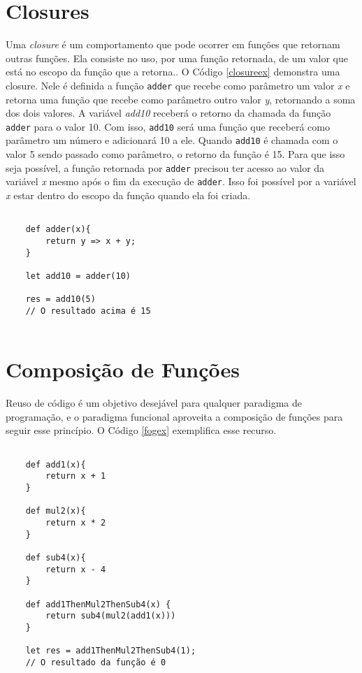 \section{Closures}

Uma \textit{closure} é um comportamento que pode 
ocorrer em funções que retornam outras funções. Ela 
consiste no uso, por uma função retornada, de um valor 
que está no escopo da função que a retorna.\cite{mflambdas}.
O Código \ref{closureex} 
demonstra uma closure. Nele é definida a função \texttt{adder} que 
recebe como parâmetro um valor \textit{x} e retorna uma função 
que recebe como parâmetro outro valor \textit{y}, retornando a 
soma dos dois valores. A variável \textit{add10} receberá 
o retorno da chamada da função \texttt{adder} para o valor 10. 
Com isso, \texttt{add10} será uma função que receberá como 
parâmetro um número e adicionará 10 a ele. Quando 
\texttt{add10} é chamada com o valor 5 sendo passado como 
parâmetro, o retorno da função é 15.
Para que isso seja possível, a função retornada por 
\texttt{adder} precisou ter acesso ao valor da variável 
\textit{x} mesmo 
após o fim da execução de \texttt{adder}. Isso foi possível 
por a variável \textit{x} estar dentro do escopo da função 
quando ela foi criada.

\begin{lstlisting}[caption={Exemplo de \textit{Closure}.},label=closureex]

    def adder(x){
        return y => x + y;
    }

    let add10 = adder(10)

    res = add10(5)
    // O resultado acima é 15


\end{lstlisting}


\section{Composição de Funções}

Reuso de código é um objetivo desejável para qualquer 
paradigma de programação, e o paradigma funcional 
aproveita a composição de funções para seguir esse 
princípio\cite{realworldhaskell}.
O Código \ref{fogex} exemplifica esse recurso.

\begin{lstlisting}[caption={Exemplo de Composição de Funções.},label=fogex]

    def add1(x){
        return x + 1
    }

    def mul2(x){
        return x * 2
    }

    def sub4(x){
        return x - 4
    }

    def add1ThenMul2ThenSub4(x) {
        return sub4(mul2(add1(x)))
    }

    let res = add1ThenMul2ThenSub4(1);
    // O resultado da função é 0

\end{lstlisting}

